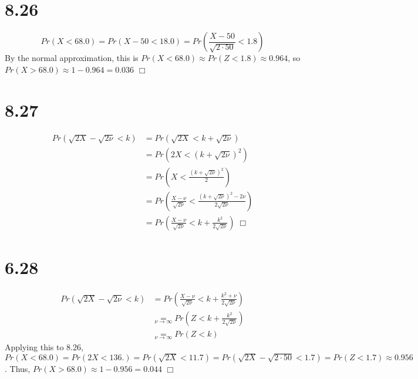 \documentclass{article}
\begin{document}
\section*{8.26}
\begin{equation*}
  Pr(X < 68.0) = Pr(X - 50 < 18.0) = Pr(\frac{X-50}{\sqrt{2 \cdot 50}} < 1.8)
\end{equation*}
By the normal approximation, this is $Pr(X < 68.0) \approx Pr(Z < 1.8) \approx 0.964$, so $Pr(X > 68.0) \approx 1 - 0.964 = 0.036$ $\Box$

\section*{8.27}
\begin{equation*}
\begin{split}
  Pr(\sqrt{2X} - \sqrt{2\nu} < k) &= Pr(\sqrt{2X} < k + \sqrt{2\nu})\\
  &= Pr(2X < (k + \sqrt{2\nu})^2)\\
  &= Pr\left(X < \frac{(k + \sqrt{2\nu})^2}{2}\right)\\
  &= Pr\left(\frac{X - \nu}{\sqrt{2\nu}} < \frac{(k+\sqrt{2\nu})^2 - 2\nu}{2\sqrt{2\nu}}\right)\\
  &= Pr\left(\frac{X - \nu}{\sqrt{2\nu}} < k + \frac{k^2}{2\sqrt{2\nu}} \right) \; \Box
\end{split}
\end{equation*}

\section*{6.28}
\begin{equation*}
\begin{split}
  Pr(\sqrt{2X} - \sqrt{2\nu} < k) &= Pr\left(\frac{X - \nu}{\sqrt{2\nu}} < k + \frac{k^2 + \nu}{2\sqrt{2\nu}} \right)\\
  & \underset{\nu \rightarrow \infty}{=} Pr\left(Z < k + \frac{k^2}{2\sqrt{2\nu}}\right)\\
  & \underset{\nu \rightarrow \infty}{=} Pr(Z < k)
\end{split}
\end{equation*}
Applying this to 8.26, $Pr(X < 68.0) = Pr(2X < 136.) = Pr(\sqrt{2X} < 11.7) = Pr(\sqrt{2X} - \sqrt{2\cdot 50} < 1.7) = Pr(Z < 1.7) \approx 0.956$. Thus, $Pr(X > 68.0) \approx 1 - 0.956 = 0.044$ $\Box$
\end{document}
